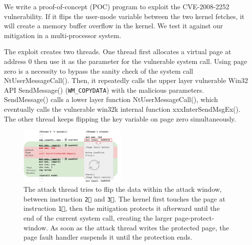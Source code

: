 We write a proof-of-concept (POC) program to exploit the CVE-2008-2252 vulnerability. If it flips the user-mode variable between the two kernel fetches, it will create a memory buffer overflow in the kernel. We test it against our mitigation in a multi-processor system.



The exploit creates two threads. One thread first allocates a virtual page at address 0 then use it as the parameter for the vulnerable system call. Using page zero is a necessity to bypass the sanity check of the system call NtUserMessageCall(). Then, it repeatedly calls the upper layer vulnerable Win32 API SendMessage() (\texttt{WM\_COPYDATA}) with the malicious parameters. SendMessage() calls a lower layer function NtUserMessageCall(), which eventually calls the vulnerable win32k internal function xxxInterSendMsgEx(). The other thread keeps flipping the key variable on page zero simultaneously.

\begin{figure}[th]
  \includegraphics[width=0.47\textwidth]{figures/ms08061case2}
  \centering
  \caption{The attack thread tries to flip the data within the attack window, between instruction \texttt{\textcircled{2}} and \texttt{\textcircled{3}}. The kernel first touches the page at instruction \texttt{\textcircled{1}}, then the mitigation protects it afterward until the end of the current system call, creating the larger page-protect-window. As soon as the attack thread writes the protected page, the page fault handler suspends it until the protection ends.}
  \label{fig:ms08061case}
\end{figure}


